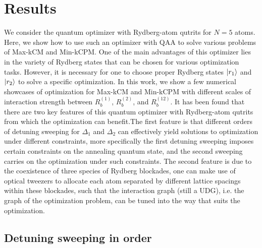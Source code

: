 \documentclass[%
 reprint,
nofootinbib,
 amsmath,amssymb,
 aps,
floatfix,
]{revtex4-2}
\begin{document}
\section{Results}

We consider the quantum optimizer with Rydberg-atom qutrits for $N = 5$ atoms. Here, we show how to use such an optimizer with QAA to solve various problems of Max-kCM and Min-kCPM. One of the main advantages of this optimizer lies in the variety of Rydberg states that can be chosen for various optimization tasks. However, it is necessary for one to choose proper Rydberg states $\ket{r_1}$ and $\ket{r_2}$ to solve a specific optimization. In this work, we show a few numerical showcases of optimization for Max-kCM and Min-kCPM with different scales of interaction strength between $R^{(1)}_b$, $R^{(2)}_b$, and $R^{(12)}_b$. It has been found that there are two key features of this quantum optimizer with Rydberg-atom qutrits from which the optimization can benefit.The first feature is that different orders of detuning sweeping for $\Delta_1$ and $\Delta_2$ can effectively yield solutions to optimization under different constraints, more specifically the first detuning sweeping imposes certain constraints on the annealing quantum state, and the second sweeping carries on the optimization under such constraints. The second feature is due to the coexistence of three species of Rydberg blockades, one can make use of optical tweezers to allocate each atom separated by different lattice spacings within these blockades, such that the interaction graph (still a UDG), i.e. the graph of the optimization problem, can be tuned into the way that suits the optimization. 

\subsection{Detuning sweeping in order}
\end{document}
